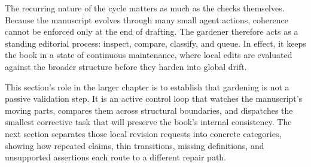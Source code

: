 The recurring nature of the cycle matters as much as the checks themselves. Because the manuscript evolves through many small agent actions, coherence cannot be enforced only at the end of drafting. The gardener therefore acts as a standing editorial process: inspect, compare, classify, and queue. In effect, it keeps the book in a state of continuous maintenance, where local edits are evaluated against the broader structure before they harden into global drift.

This section's role in the larger chapter is to establish that gardening is not a passive validation step. It is an active control loop that watches the manuscript's moving parts, compares them across structural boundaries, and dispatches the smallest corrective task that will preserve the book's internal consistency. The next section separates those local revision requests into concrete categories, showing how repeated claims, thin transitions, missing definitions, and unsupported assertions each route to a different repair path.
